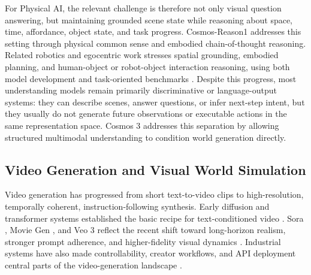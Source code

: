 For Physical AI, the relevant challenge is therefore not only visual question answering, but maintaining grounded scene state while reasoning about space, time, affordance, object state, and task progress.
Cosmos-Reason1 \citep{azzolini2025cosmos} addresses this setting through physical common sense and embodied chain-of-thought reasoning.
Related robotics and egocentric work stresses spatial grounding, embodied planning, and human-object or robot-object interaction reasoning, using both model development and task-oriented benchmarks \citep{sermanet2024robovqa,HoloAssist2023,chen2025robo2vlm,yang2025magma,chen2024spatialvlm,song2025robospatial,zhou2025roborefer,yang2025embodiedbench}.
Despite this progress, most understanding models remain primarily discriminative or language-output systems: they can describe scenes, answer questions, or infer next-step intent, but they usually do not generate future observations or executable actions in the same representation space.
Cosmos 3 addresses this separation by allowing structured multimodal understanding to condition world generation directly.

\subsection{Video Generation and Visual World Simulation}
Video generation has progressed from short text-to-video clips to high-resolution, temporally coherent, instruction-following synthesis.
Early diffusion and transformer systems established the basic recipe for text-conditioned video \citep{ho2022video,singer2022makeavideo,ho2022imagen,villegas2022phenaki,blattmann2023stablevideo,bartal2024lumiere,hacohen2024ltx,videopoet,emuvideo,yang2024cogvideox,opensora2,mochi1,waver}.
Sora \citep{sora,sora2}, Movie Gen \citep{polyak2024movie}, and Veo 3 \citep{veo3,veo31} reflect the recent shift toward long-horizon realism, stronger prompt adherence, and higher-fidelity visual dynamics \citep{kong2024hunyuanvideo,wan2025,gao2025seedance,arkhipkin2025kandinsky}.
Industrial systems have also made controllability, creator workflows, and API deployment central parts of the video-generation landscape \citep{gen3,runway_gen4,kling,kling2,dreammachine,ray2,minimax,hailuo02,pika,firefly_video,nova_reel}.

